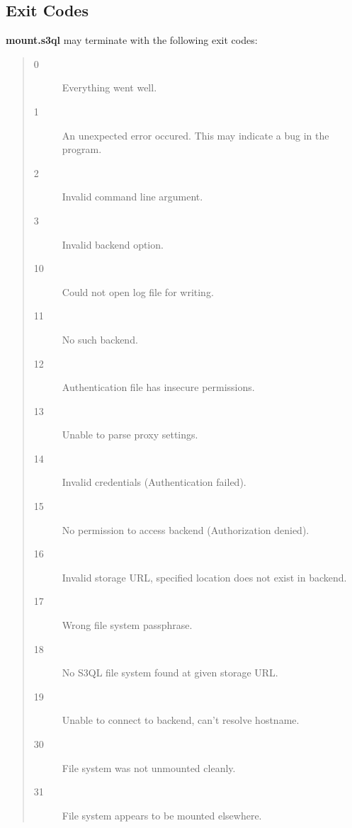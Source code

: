 \documentclass[letterpaper,10pt,english]{sphinxmanual}
\begin{document}
\subsection{Exit Codes}
\label{man/mount:exit-codes}
\textbf{mount.s3ql} may terminate with the following exit codes:
\begin{quote}\begin{description}
\item[{0}] \leavevmode
Everything went well.

\item[{1}] \leavevmode
An unexpected error occured. This may indicate a bug in the
program.

\item[{2}] \leavevmode
Invalid command line argument.

\item[{3}] \leavevmode
Invalid backend option.

\item[{10}] \leavevmode
Could not open log file for writing.

\item[{11}] \leavevmode
No such backend.

\item[{12}] \leavevmode
Authentication file has insecure permissions.

\item[{13}] \leavevmode
Unable to parse proxy settings.

\item[{14}] \leavevmode
Invalid credentials (Authentication failed).

\item[{15}] \leavevmode
No permission to access backend (Authorization denied).

\item[{16}] \leavevmode
Invalid storage URL, specified location does not exist in backend.

\item[{17}] \leavevmode
Wrong file system passphrase.

\item[{18}] \leavevmode
No S3QL file system found at given storage URL.

\item[{19}] \leavevmode
Unable to connect to backend, can't resolve hostname.

\item[{30}] \leavevmode
File system was not unmounted cleanly.

\item[{31}] \leavevmode
File system appears to be mounted elsewhere.


\end{description}
\end{quote}
\end{document}

